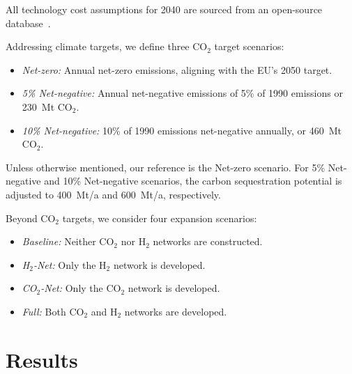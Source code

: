 \documentclass[twocolumn]{article}
\newcommand{\carbon}{CO$_2$}
\newcommand{\hydrogen}{H$_2$}
\begin{document}
All technology cost assumptions for 2040 are sourced from an open-source database~\cite{lisazeyenPyPSATechnologydataTechnology2023}.

Addressing climate targets, we define three \carbon{} target scenarios:
\begin{itemize}
    \item[] \textit{Net-zero:} Annual net-zero emissions, aligning with the EU's 2050 target.
    \item[] \textit{5\% Net-negative:} Annual net-negative emissions of 5\% of 1990 emissions or 230~Mt \carbon{}.
    \item[] \textit{10\% Net-negative:} 10\% of 1990 emissions net-negative annually, or 460~Mt \carbon{}.
\end{itemize}
Unless otherwise mentioned, our reference is the Net-zero scenario. For 5\% Net-negative and 10\% Net-negative scenarios, the carbon sequestration potential is adjusted to 400~Mt/a and 600~Mt/a, respectively.

Beyond \carbon{} targets, we consider four expansion scenarios:
\begin{itemize}
    \item[] \textit{Baseline:} Neither \carbon{} nor \hydrogen{} networks are constructed.
    \item[] \textit{\hydrogen{}-Net:} Only the \hydrogen{} network is developed.
    \item[] \textit{\carbon{}-Net:} Only the \carbon{} network is developed.
    \item[] \textit{Full:} Both \carbon{} and \hydrogen{} networks are developed.
\end{itemize}



\section{Results}
\label{sec:results}


\begin{figure*}[ht!]
    \centering
    \caption[short]{Total annual system cost for the sector-coupled system with different levels of carbon sequestration potential, with (left) and without (right) \carbon{} network. "Gas Infrastructure" combines gas facilities for power and heat production, "H$_2$ Infrastructure" combines H$_2$ production, transport and re-electrification. Regardless of the implementation of a \carbon{} network, the system cost decrease as sequestration increases. Due to an increased flexibility from fossil carriers with subsequent sequestration, the need for FT synthesis and \hydrogen{} electrolysis and the corresponding renewable power supply is reduced.
    }
    \label{fig:cost_area}
\end{figure*}
\end{document}
